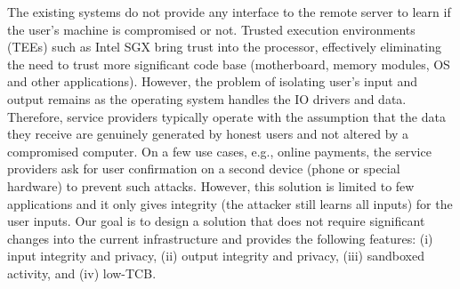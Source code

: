 
The existing systems do not provide any interface to the remote server to learn if the user's machine is compromised or not. Trusted execution environments (TEEs) such as Intel SGX bring trust into the processor, effectively eliminating the need to trust more significant code base (motherboard, memory modules, OS and other applications). However, the problem of isolating user's input and output remains as the operating system handles the IO drivers and data. Therefore, service providers typically operate with the assumption that the data they receive are genuinely generated by honest users and not altered by a compromised computer. On a few use cases, e.g., online payments, the service providers ask for user confirmation on a second device (phone or special hardware) to prevent such attacks. However, this solution is limited to few applications and it only gives integrity (the attacker still learns all inputs) for the user inputs. Our goal is to design a solution that does not require significant changes into the current infrastructure and provides the following features: (i) input integrity and privacy, (ii) output integrity and privacy, (iii) sandboxed activity, and (iv) low-TCB.


